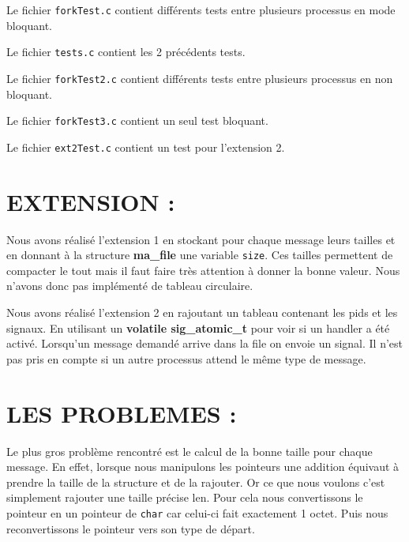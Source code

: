 \documentclass{article}
\begin{document}
Le fichier {\tt forkTest.c} contient différents tests entre plusieurs processus en mode bloquant.

Le fichier {\tt tests.c} contient les 2 précédents tests.

Le fichier {\tt forkTest2.c} contient différents tests entre plusieurs processus en non bloquant.

Le fichier {\tt forkTest3.c} contient un seul test bloquant.

Le fichier {\tt ext2Test.c} contient un test pour l'extension 2.

\section{EXTENSION : }

Nous avons réalisé l'extension 1 en stockant pour chaque message leurs tailles et
en donnant à la structure {\bf ma\_file} une variable {\tt size}. Ces tailles permettent de compacter le
tout mais il faut faire très attention à donner la bonne valeur. Nous n'avons donc pas implémenté
de tableau circulaire.


Nous avons réalisé l'extension 2 en rajoutant un tableau contenant les pids et les signaux.
En utilisant un {\bf volatile sig\_atomic\_t} pour voir si un handler a été activé.
Lorsqu'un message demandé arrive dans la file on envoie un signal. Il n'est pas pris
en compte si un autre processus attend le même type de message.

\section{LES PROBLEMES : }

Le plus gros problème rencontré est le calcul de la bonne taille pour chaque message.
 En effet, lorsque nous manipulons les pointeurs une addition équivaut à prendre la taille
de la structure et de la rajouter. Or ce que nous voulons c'est simplement rajouter une taille
précise len. Pour cela nous convertissons le pointeur en un pointeur de {\tt char} car celui-ci
fait exactement 1 octet. Puis nous reconvertissons le pointeur vers son type de départ.
\end{document}
